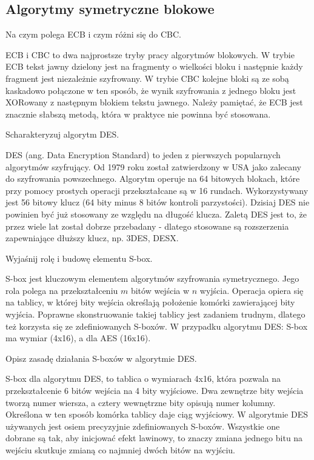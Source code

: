 \documentclass[answers,11pt]{exam}
\begin{document}
\subsection{Algorytmy symetryczne blokowe}
\begin{questions}

\question Na czym polega ECB i czym różni się do CBC.
\begin{solution}
ECB i CBC to dwa najprostsze tryby pracy algorytmów blokowych. W trybie ECB tekst jawny dzielony jest na fragmenty o wielkości bloku i następnie każdy fragment jest niezależnie szyfrowany. W trybie CBC kolejne bloki są ze sobą kaskadowo połączone w ten sposób, że wynik szyfrowania z jednego bloku jest XORowany z następnym blokiem tekstu jawnego. Należy pamiętać, że ECB jest znacznie słabszą metodą, która w praktyce nie powinna być stosowana.
\end{solution}

\question Scharakteryzuj algorytm DES.
\begin{solution}
DES (ang. Data Encryption Standard) to jeden z pierwszych popularnych algorytmów szyfrujący. Od 1979 roku został zatwierdzony w USA jako zalecany do szyfrowania powszechnego. Algorytm operuje na 64 bitowych blokach, które przy pomocy prostych operacji przekształcane są w 16 rundach. Wykorzystywany jest 56 bitowy klucz (64 bity minus 8 bitów kontroli parzystości). Dzisiaj DES nie powinien być już stosowany ze względu na długość klucza. Zaletą DES jest to, że przez wiele lat został dobrze przebadany - dlatego stosowane są rozszerzenia zapewniające dłuższy klucz, np. 3DES, DESX.
\end{solution}

\question Wyjaśnij rolę i budowę elementu S-box.
\begin{solution}
S-box jest kluczowym elementem algorytmów szyfrowania symetrycznego. Jego rola polega na przekształceniu $m$ bitów wejścia w $n$ wyjścia. Operacja opiera się na tablicy, w której bity wejścia określają położenie komórki zawierającej bity wyjścia. Poprawne skonstruowanie takiej tablicy jest zadaniem trudnym, dlatego też korzysta się ze zdefiniowanych S-boxów. W przypadku algorytmu DES: S-box ma wymiar (4x16), a dla AES (16x16). 
\end{solution}

\question Opisz zasadę działania S-boxów w algorytmie DES.
\begin{solution}
S-box dla algorytmu DES, to tablica o wymiarach 4x16, która pozwala na przekształcenie 6 bitów wejścia na 4 bity wyjściowe. Dwa zewnętrze bity wejścia tworzą numer wiersza, a cztery wewnętrzne bity opisują numer kolumny. Określona w ten sposób komórka tablicy daje ciąg wyjściowy. W algorytmie DES używanych jest osiem precyzyjnie zdefiniowanych S-boxów. Wszystkie one dobrane są tak, aby inicjować efekt lawinowy, to znaczy zmiana jednego bitu na wejściu skutkuje zmianą co najmniej dwóch bitów na wyjściu.
\end{solution}


\end{questions}
\end{document}

